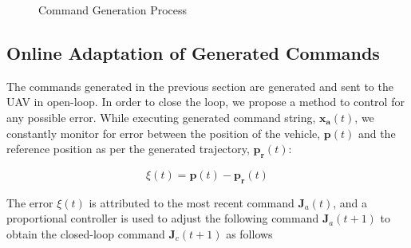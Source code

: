 \documentclass[letterpaper, 10 pt, conference]{ieeeconf}  %
\begin{document}
\begin{figure}[h]
	\centering
	\caption{Command Generation Process}
	\label{fig:gensample}
\end{figure}

\subsection{Online Adaptation of Generated Commands}

The commands generated in the previous section are generated and sent to the UAV in open-loop. In order to close the loop, we propose a method to control for any possible error. While executing generated command string, $\mathbf{x_a}(t)$, we constantly monitor for error between the position of the vehicle, $\mathbf{p}(t)$ and the reference position as per the generated trajectory, $\mathbf{p_r}(t)$:

\begin{equation}
    \xi(t) = \mathbf{p}(t)-\mathbf{p_r}(t)
\end{equation}

The error $\xi(t)$ is attributed to the most recent command $\mathbf{J}_a(t)$, and a proportional controller is used to adjust the following command $\mathbf{J}_a(t+1)$ to obtain the closed-loop command $\mathbf{J}_c(t+1)$ as follows
\end{document}
